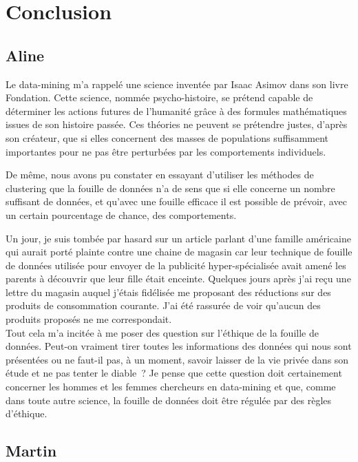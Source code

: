 \chapter{Conclusion}

\section{Aline}

Le data-mining m'a rappelé une science inventée par Isaac Asimov dans son livre Fondation. Cette science, nommée psycho-histoire, se prétend capable de déterminer les actions futures de l'humanité grâce à des formules mathématiques issues de son histoire passée. Ces théories ne peuvent se prétendre justes, d'après son créateur, que si elles concernent des masses de populations suffisamment importantes pour ne pas être perturbées par les comportements individuels.

De même, nous avons pu constater en essayant d'utiliser les méthodes de clustering que la fouille de données n'a de sens que si elle concerne un nombre suffisant de données, et qu'avec une fouille efficace il est possible de prévoir, avec un certain pourcentage de chance, des comportements.

Un jour, je suis tombée par hasard sur un article parlant d'une famille américaine qui aurait porté plainte contre une chaine de magasin car leur technique de fouille de données utilisée pour envoyer de la publicité hyper-spécialisée avait amené les parents à découvrir que leur fille était enceinte. Quelques jours après j'ai reçu une lettre du magasin auquel j'étais fidélisée me proposant des réductions sur des produits de consommation courante. J'ai été rassurée de voir qu'aucun des produits proposés ne me correspondait.
\\

Tout cela m'a incitée à me poser des question sur l'éthique de la fouille de données. Peut-on vraiment tirer toutes les informations des données qui nous sont présentées ou ne faut-il pas, à un moment, savoir laisser de la vie privée dans son étude et ne pas tenter le diable~? Je pense que cette question doit certainement concerner les hommes et les femmes chercheurs en data-mining et que, comme dans toute autre science, la fouille de données doit être régulée par des règles d'éthique.


\section{Martin}

